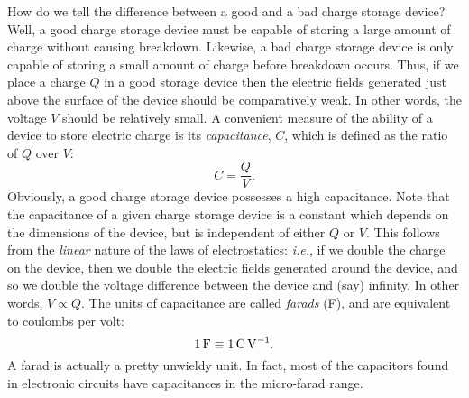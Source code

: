 How do we tell the difference between a good  and a
bad  charge storage device? Well, a good charge storage device must be capable of
storing a large amount of charge without causing breakdown. Likewise,
a bad charge storage device is only capable of storing a small amount of
charge before breakdown occurs. Thus, if we place a charge $Q$
in a good storage device then the electric fields generated just above the surface of
the device should be comparatively weak. In other words, the voltage $V$
should be relatively small. A convenient measure of the ability of a device
to store electric charge is its {\em capacitance}, $C$, which is defined as the
ratio of $Q$ over $V$:
\begin{equation}\label{e6.6}
C = \frac{Q}{V}.
\end{equation}
Obviously, a good charge storage device possesses a high capacitance. Note
that the capacitance of a given charge storage device is a constant
which depends on the dimensions of the device, but is independent of either
$Q$ or $V$. This follows from the {\em linear}\/  nature of the laws of
electrostatics: {\em i.e.}, if we double the charge on the device, then we double the
electric fields generated around the device, and so we double the
voltage difference between the device and (say) infinity. In other words,
$V\propto Q$. The units of capacitance are called {\em farads}\/ (F), and 
are equivalent to coulombs per volt:
\begin{equation}
1\,{\rm F} \equiv 1\,{\rm C\,V}^{-1}.
\end{equation}
A farad is actually a pretty unwieldy
unit. In fact, most of the capacitors found in electronic circuits have capacitances  in the micro-farad
range. 

